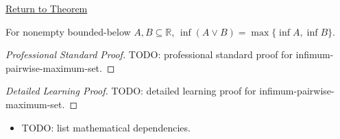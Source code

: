 \newpage
{}
\label{prf:infimum-pairwise-maximum-set}

\begin{remark*}[Return]
\hyperref[thm:infimum-pairwise-maximum-set]{Return to Theorem}
\end{remark*}

\begin{theorem*}
For nonempty bounded-below $A,B\subseteq\mathbb{R}$,
$\inf(A\vee B)=\max\{\inf A,\inf B\}$.
\end{theorem*}

\begin{proof}[Professional Standard Proof]
\LRAProofBodyStart
TODO: professional standard proof for infimum-pairwise-maximum-set.
\end{proof}

\begin{proof}[Detailed Learning Proof]
\LRAProofBodyStart
TODO: detailed learning proof for infimum-pairwise-maximum-set.
\end{proof}

\begin{remark*}
\end{remark*}

\begin{dependencies}
\begin{itemize}
  \item TODO: list mathematical dependencies.
\end{itemize}
\end{dependencies}

\clearpage
